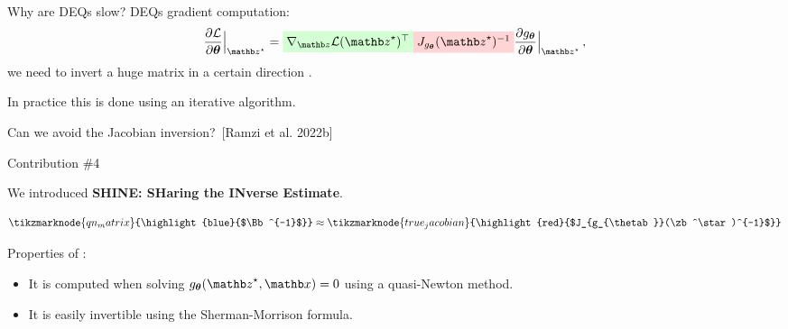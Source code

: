 \begin{frame}{Why are DEQs slow?}
    DEQs gradient computation:
    \begin{equation*}
        \frac{\partial \mathcal{L}}{\partial \thetab}\Bigr|_{\zb^\star} = \highlight{green}{$\nabla_\zb \mathcal{L}(\zb^\star)^\top$} \highlight{red}{$J_{g_{\thetab}}(\zb^\star)^{-1}$} \frac{\partial g_{\thetab}}{\partial \thetab}\Bigr|_{\zb^\star} \, ,
    \end{equation*}
    we need to invert a huge matrix  in a certain direction .
    \pause

    In practice this is done using an iterative algorithm.
\end{frame}

\begin{frame}{Can we avoid the Jacobian inversion?~[Ramzi et al. 2022b]}
    \begin{exampleblock}{Contribution \#4}
    \end{exampleblock}

    We introduced \textbf{SHINE: SHaring the INverse Estimate}.

    \begin{equation*}
        \tikzmarknode{qn_matrix}{\highlight{blue}{$\Bb^{-1}$}} \approx \tikzmarknode{true_jacobian}{\highlight{red}{$J_{g_{\thetab}}(\zb^\star)^{-1}$}}
    \end{equation*}

    \pause

    \hfill \break
    Properties of :
    \begin{itemize}
        \item<4-> It is computed when solving $g_\thetab(\zb^\star, \xb) = 0$ using a quasi-Newton method.
        \item<5-> It is easily invertible using the Sherman-Morrison formula.
    \end{itemize}
\end{frame}

